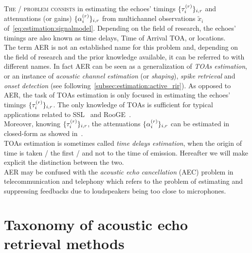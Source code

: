 \mynewline
\textsc{The \AERdef/ problem consists} in estimating the echoes' timings $\{\tau_{i}^{(r)}\}_{i,r}$ and attenuations (or gains) $\{\alpha_{i}^{(r)}\}_{i,r}$ from multichannel observations $\tilde{x}_i$ of~\cref{eq:estimation:signalmodel}.
Depending on the field of research, the echoes' timings are also known as time delays, Time of Arrival \acs{TOA}, or locations.
\\The term \ac{AER} is not an established name for this problem and, depending on the field of research and the prior knowledge available, it can be referred to with different names.
In fact \ac{AER} can be seen as a generalization of \textit{\acp{TOA} estimation}, or an instance of \textit{acoustic channel estimation} (or \textit{shaping}), \textit{spike retrieval} and \textit{onset detection} (see following~\cref{subsec:estimation:active_rir}).
As opposed to \ac{AER}, the task of \acp{TOA} estimation is only focused in estimating the echoes' timings $\{\tau_{i}^{(r)}\}_{i,r}$.
The only knowledge of \acp{TOA} is sufficient for typical applications related to \acf{SSL}~ and \ac{RooGE}~.
\\Moreover, knowing $\{\tau_{i}^{(r)}\}_{i,r}$, the attenuations $\{\alpha_{i}^{(r)}\}_{i,r}$ can be estimated in closed-form as showed in~.
\\\acp{TOA} estimation is sometimes called \textit{time delays estimation}, when the origin of time is taken \wrt/ the first \TOA/ and not to the time of emission.
Hereafter we will make explicit the distinction between the two.
\\\ac{AER} may be confused with the \textit{acoustic echo cancellation} (AEC) problem in telecommunication and telephony which refers to the problem of estimating and suppressing feedbacks due to loudspeakers being too close to microphones.

\section{Taxonomy of acoustic echo retrieval methods}\label{sec:estimation:taxonomy}


